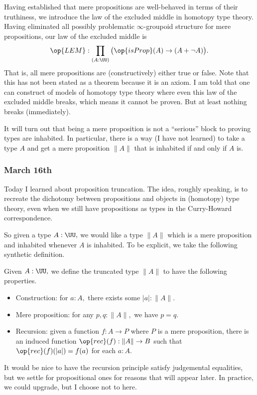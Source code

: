 Having established that mere propositions are well-behaved in terms of their truthiness, we introduce the law of the excluded middle in homotopy type theory. Having eliminated all possibly problematic $\infty$-groupoid structure for mere propositions, our law of the excluded middle is
\[\op{LEM}:\prod_{(A:\UU)}\big(\op{isProp}(A)\to(A+\lnot A)\big).\]
That is, all mere propositions are (constructively) either true or false. Note that this has not been stated as a theorem because it is an axiom. I am told that one can construct of models of homotopy type theory where even this law of the excluded middle breaks, which means it cannot be proven. But at least nothing breaks (immediately).

It will turn out that being a mere proposition is not a ``serious'' block to proving types are inhabited. In particular, there is a way (I have not learned) to take a type $A$ and get a mere proposition $\lVert A\rVert$ that is inhabited if and only if $A$ is.

\subsubsection{March 16th}
Today I learned about proposition truncation. The idea, roughly speaking, is to recreate the dichotomy between propositions and objects in (homotopy) type theory, even when we still have propositions as types in the Curry-Howard correspondence.

So given a type $A:\UU,$ we would like a type $\lVert A\rVert$ which is a mere proposition and inhabited whenever $A$ is inhabited. To be explicit, we take the following synthetic definition.
\begin{definition}
    Given $A:\UU,$ we define the truncated type $\lVert A\rVert$ to have the following properties.
    \begin{itemize}
        \item Construction: for $a:A,$ there exists some $|a|:\lVert A\rVert.$
        \item Mere proposition: for any $p,q:\lVert A\rVert,$ we have $p=q.$
        \item Recursion: given a function $f:A\to P$ where $P$ is a mere proposition, there is an induced function $\op{rec}(f):\lVert A\rVert\to B$ such that $\op{rec}(f)(|a|)=f(a)$ for each $a:A.$
    \end{itemize}
\end{definition}
It would be nice to have the recursion principle satisfy judgemental equalities, but we settle for propositional ones for reasons that will appear later. In practice, we could upgrade, but I choose not to here.


